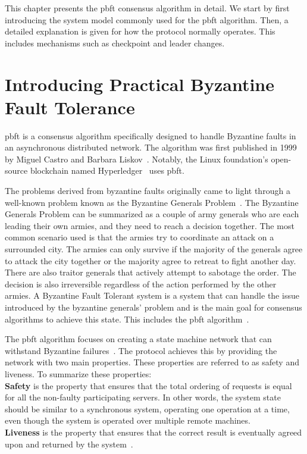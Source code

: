 This chapter presents the \acl{pbft} consensus algorithm in detail.
We start by first introducing the system model commonly used for the \ac{pbft} algorithm. Then, a detailed explanation is given for how the protocol normally operates. This includes mechanisms such as checkpoint and leader changes.

\section{Introducing Practical Byzantine Fault Tolerance}
\acl{pbft} is a consensus algorithm specifically designed to handle Byzantine faults in an asynchronous distributed network. The algorithm was first published in 1999 by Miguel Castro and Barbara Liskov~\cite{PAPER:OGPBFT}.
Notably, the Linux foundation's open-source blockchain named Hyperledger~\cite{WEB:PBFTGeeks, SLIDES:PBFT, VIDEO:YPBFT} uses \ac{pbft}.

The problems derived from byzantine faults originally came to light through a well-known problem known as the Byzantine Generals Problem~\cites{WEB:BFTInfo}{VIDEO:YPBFT}{WEB:ImpPBFTBlock}[p.~382]{ART:lamportByzGenProb}[p.~240-253]{BOOK:BuildDepDistSyst}.
The Byzantine Generals Problem can be summarized as a couple of army generals who are each leading their own armies, and they need to reach a decision together. The most common scenario used is that the armies try to coordinate an attack on a surrounded city. The armies can only survive if the majority of the generals agree to attack the city together or the majority agree to retreat to fight another day. There are also traitor generals that actively attempt to sabotage the order. The decision is also irreversible regardless of the action performed by the other armies. A Byzantine Fault Tolerant system is a system that can handle the issue introduced by the byzantine generals’ problem and is the main goal for consensus algorithms to achieve this state. This includes the \ac{pbft} algorithm~\cites{WEB:BFTInfo}{VIDEO:YPBFT}[p.~382-384]{ART:lamportByzGenProb}.

The \ac{pbft} algorithm focuses on creating a state machine network that can withstand Byzantine failures~\cite[p.~456]{BOOK:MVstandver3}. The protocol achieves this by providing the network with two main properties. These properties are referred to as safety and liveness.
To summarize these properties:\\

\textbf{Safety} is the property that ensures that the total ordering of requests is equal for all the non-faulty participating servers. In other words, the system state should be similar to a synchronous system, operating one operation at a time, even though the system is operated over multiple remote machines.\\
\textbf{Liveness} is the property that ensures that the correct result is eventually agreed upon and returned by the system~\cites{WEB:ImpPBFTBlock}[p.~456]{BOOK:MVstandver3}{WEB:ConsesAlgo}[p.~2]{PAPER:OGPBFT}{SLIDES:PBFT}[p.~403]{PAPER:PBFTRecovery}[p.~257]{BOOK:BuildDepDistSyst}.

